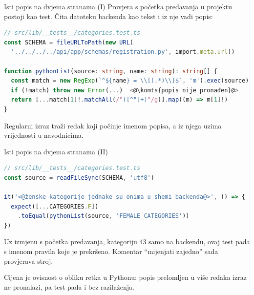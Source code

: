 \begin{frame}[fragile]{Isti popis na dvjema stranama (I)}
Provjera s početka predavanja u projektu postoji kao test. Čita datoteku backenda kao tekst i iz nje vadi popis:

\begin{lstlisting}[language=typescript]
// src/lib/__tests__/categories.test.ts
const SCHEMA = fileURLToPath(new URL(
  '../../../../api/app/schemas/registration.py', import.meta.url))

function pythonList(source: string, name: string): string[] {
  const match = new RegExp(`^${name} = \\[(.*)\\]$`, 'm').exec(source)
  if (!match) throw new Error(...)  <@\komts{popis nije pronađen}@>
  return [...match[1]!.matchAll(/"([^"]+)"/g)].map((m) => m[1]!)
}
\end{lstlisting}

\vspace{0.3em}
Regularni izraz traži redak koji počinje imenom popisa, a iz njega uzima vrijednosti u navodnicima.
\end{frame}


\begin{frame}[fragile]{Isti popis na dvjema stranama (II)}
\begin{lstlisting}[language=typescript]
// src/lib/__tests__/categories.test.ts
const source = readFileSync(SCHEMA, 'utf8')

it('<@ženske kategorije jednake su onima u shemi backenda@>', () => {
  expect([...CATEGORIES.F])
    .toEqual(pythonList(source, 'FEMALE_CATEGORIES'))
})
\end{lstlisting}

\vspace{0.4em}
Uz izmjenu s početka predavanja, kategoriju 43 samo na backendu, ovaj test pada s imenom pravila koje je prekršeno. Komentar \enquote{mijenjati zajedno} sada provjerava stroj.

\vspace{0.4em}
Cijena je ovisnost o obliku retka u Pythonu: popis prelomljen u više redaka izraz ne pronalazi, pa test pada i bez razilaženja.
\end{frame}

